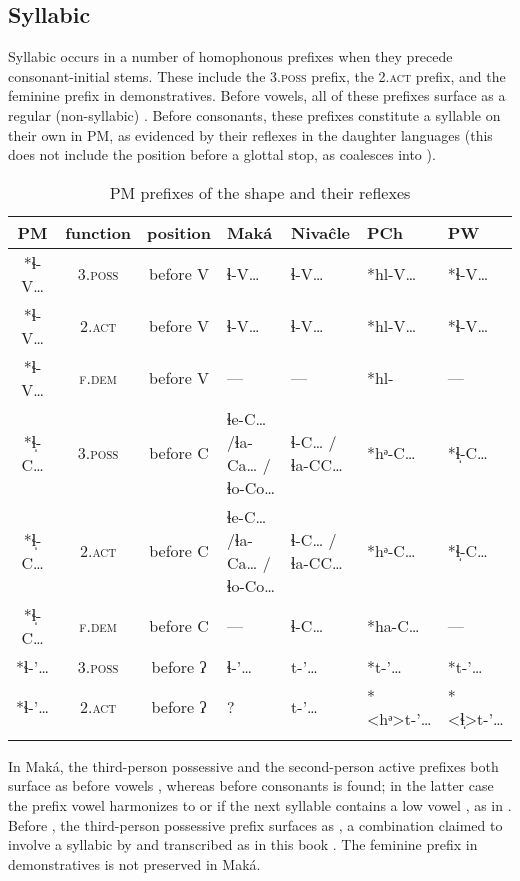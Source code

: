 \subsection{Syllabic }\label{syllabic-lh}
Syllabic  occurs in a number of homophonous prefixes when they precede consonant-initial stems. These include the 3.{\textsc{poss}} prefix, the 2.{\textsc{act}} prefix, and the feminine prefix in demonstratives. Before vowels, all of these prefixes surface as a regular (non-syllabic) . Before consonants, these prefixes constitute a syllable on their own in PM, as evidenced by their reflexes in the daughter languages (this does not include the position before a glottal stop, as  coalesces into ).

\begin{table}
\caption{PM prefixes of the shape  and their reflexes}
\label{PM-lh-syll-refl}
 \begin{tabularx}{\textwidth}{cccXXXX}
  \lsptoprule
            PM & function & position & Maká & Nivaĉle & PCh & PW\\\midrule
  *ɬ-V… & 3.{\textsc{poss}} & before V & ɬ-V… & ɬ-V… & *hl-V… & *ɬ-V…\\
  *ɬ-V… & 2.{\textsc{act}} & before V & ɬ-V… & ɬ-V… & *hl-V… & *ɬ-V…\\
  *ɬ-V… & {\textsc{f.dem}} & before V & --- & --- & *hl- & ---\\
  *ɬ̩-C… & 3.{\textsc{poss}} & before C & ɬe-C… /\newline ɬa-Ca… /\newline ɬo-Co… & ɬ-C… /\newline ɬa-CC… & *hᵊ-C… & *ɬ̩-C…\\
  *ɬ̩-C… & 2.{\textsc{act}} & before C & ɬe-C… /\newline ɬa-Ca… /\newline ɬo-Co… & ɬ-C… /\newline ɬa-CC… & *hᵊ-C… & *ɬ̩-C…\\
  *ɬ̩-C… & {\textsc{f.dem}} & before C & --- & ɬ-C… & *ha-C… & ---\\
  *ɬ-’… & 3.{\textsc{poss}} & before ʔ & ɬ-’… & t-’… & *t-’… & *t-’…\\
  *ɬ-’… & 2.{\textsc{act}} & before ʔ & ? & t-’… &  *<hᵊ>t-’… &  *<ɬ̩>t-’…\\
  \lspbottomrule
 \end{tabularx}
\end{table}

In Maká, the third-person possessive and the second-person active prefixes both surface as  before vowels , whereas before consonants  is found; in the latter case the prefix vowel harmonizes to  or  if the next syllable contains a low vowel \citep[106--107]{AG-BG03}, as in . Before , the third-person possessive prefix surfaces as , a combination claimed to involve a syllabic  by \citet[67]{AG89} and transcribed as  in this book . The feminine prefix in demonstratives is not preserved in Maká.


